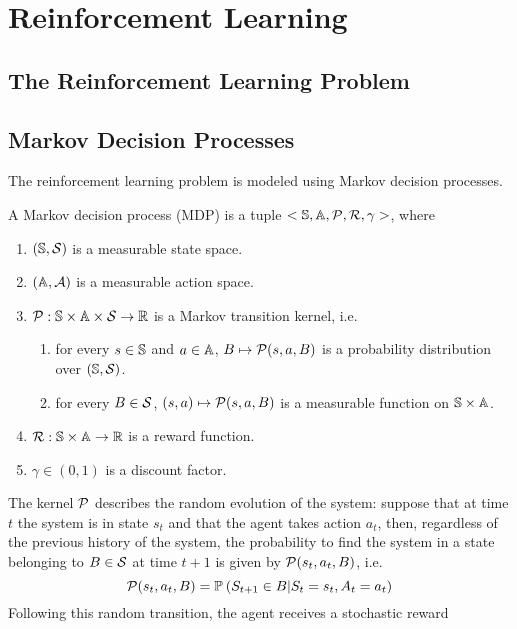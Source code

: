 \chapter{Reinforcement Learning}

\section{The Reinforcement Learning Problem}

\section{Markov Decision Processes}
The reinforcement learning problem is modeled using Markov decision processes.
\begin{definition}
	A Markov decision process (MDP) is a tuple $<\S, \A, \calP, \calR,
	\gamma>$, where
	\begin{enumerate}[label={\roman*)}]
		\item $(\S, \calS)$ is a measurable state space.
		\item $(\A, \calA)$ is a measurable action space. 
		\item $\calP: \S \times \A \times \calS \to \R$ is a Markov transition
			kernel, i.e.
			\begin{enumerate}[label={\alph*)}]
				\item for every $s\in\S$ and $a\in\A$, $B \mapsto \calP(s,a,B)$
					  is a probability distribution over $(\S, \calS)$.
				\item for every $B\in\calS$, $(s,a) \mapsto \calP(s,a,B)$ is
					  a measurable function on $\S \times \A$.
			\end{enumerate}
		\item $\calR: \S \times \A \to \R$ is a reward function.
		\item $\gamma \in (0,1)$ is a discount factor. 
	\end{enumerate}
\end{definition}
The kernel $\calP$ describes the random evolution of the system: suppose that
at time $t$ the system is in state $s_t$ and that the agent takes action $a_t$,
then, regardless of the previous history of the system, the probability to find
the system in a state belonging to $B\in\calS$ at time $t+1$ is given by
$\calP(s_t, a_t, B)$, i.e.
\begin{equation}
	\calP(s_t, a_t, B) = \P{S_{t+1} \in B | S_t = s_t, A_t = a_t}
\end{equation}
Following this random transition, the agent receives a stochastic reward
